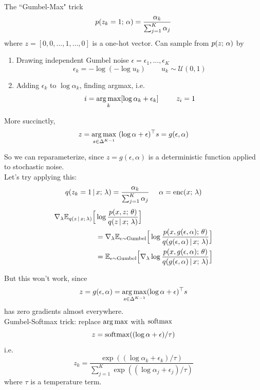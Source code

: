\begin{frame}
The ``Gumbel-Max" trick \citep{Papandreou2011}
\[ p(z_k = 1 ; \, \alpha) = \frac{\alpha_k}{\sum_{j=1}^K \alpha_j} \]
where $z = [0, 0, \dots, 1 , \dots, 0]$ is a one-hot vector.
Can sample from $p(z ; \, \alpha)$ by
\begin{enumerate}
    \item Drawing independent Gumbel noise $\epsilon =  \epsilon_1, \dots, \epsilon_K$
    \[ \epsilon_k = -\log (- \log u_k) \,\,\,\,\,\,\,\,\,\,\,\,\, u_k \sim \mathcal{U}(0, 1)\]
    \item Adding $\epsilon_k$ to $\log \alpha_k$, finding argmax, i.e.
    \[ i = \argmax_k [\log \alpha_k + \epsilon_k] \,\,\,\,\,\,\,\,\,\,\,\,\,\,\,
    z_i = 1 \]

\end{enumerate}
    More succinctly,
    \[ z = \argmax_{s \in \Delta^{K-1}}  \,\,(\log \alpha + \epsilon)^\top s = g(\epsilon, \alpha) \]
    
\end{frame}

\begin{frame}
So we can reparameterize, since $z = g(\epsilon, \alpha)$ is a deterministic function applied to stochastic noise. \\ Let's try applying this:
\[ q(z_k = 1 \,|\, x ; \, \lambda) = \frac{\alpha_k}{\sum_{j=1}^K \alpha_j} \,\,\,\,\,\,\,\, \alpha = \operatorname*{enc}(x ; \, \lambda) \]
\begin{align*}
    \nabla_\lambda \mathbb{E}_{q(z \,|\, x ; \, \lambda)}\Big[& \log \frac{p(x, z ; \, \theta)}{q(z \,|\, x ; \, \lambda)}\Big] \\ &= 
    \nabla_\lambda \mathbb{E}_{\epsilon \sim \text{Gumbel}}\Big[ \log \frac{ p(x, g(\epsilon, \alpha) ; \, \theta)}{q(g(\epsilon, \alpha) \,|\, x ; \, \lambda)}\Big] \\
    &=      \mathbb{E}_{\epsilon \sim \text{Gumbel}}\Big[\nabla_\lambda \log \frac{ p(x, g(\epsilon, \alpha) ; \, \theta)}{q(g(\epsilon, \alpha) \,|\, x ; \, \lambda)}\Big]
\end{align*}
\end{frame}

\begin{frame}
But this won't work, since
\[ z = g(\epsilon, \alpha) = \argmax_{s \in \Delta^{K-1}} (\log \alpha + \epsilon)^\top s \]
has zero gradients almost everywhere.
\\ \vspace{3mm}
Gumbel-Softmax trick: replace $\argmax$ with $\operatorname*{softmax}$
\[ z = \operatorname*{softmax}((\log \alpha + \epsilon)/\tau) \]
i.e.
\[ z_k = \frac{\exp((\log \alpha_k + \epsilon_k)/\tau)}{\sum_{j=1}^K \exp ((\log \alpha_j + \epsilon_j)/\tau)}\]
where $\tau$ is a temperature term. 
\end{frame}


